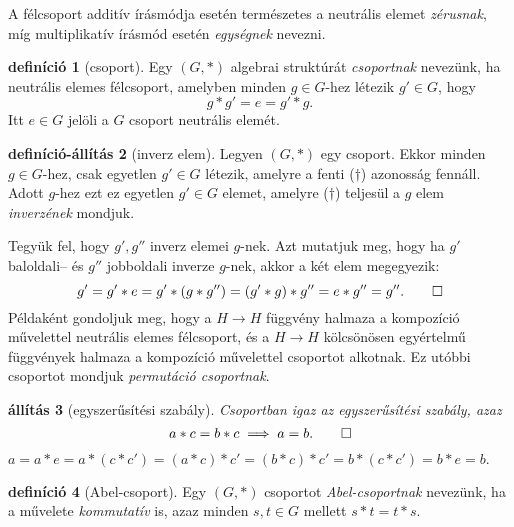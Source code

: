 \documentclass[9pt, a4paper, showtrims]{memoir}
\makeatletter
\renewenvironment{proof}[1][\proofname]
    {\par\pushQED{\qed}%
    \normalfont \topsep6\p@\@plus6\p@\relax
    \trivlist
    \item[\hskip\labelsep
        \itshape
    #1\@addpunct{:}]\ignorespaces}
    {\popQED\endtrivlist\@endpefalse}
\theoremstyle{plain}
\newtheorem{proposition}{állítás}[chapter]
\theoremstyle{remark}
\theoremstyle{definition}
\newtheorem{definition}[proposition]{definíció}
\newtheorem{defprop}[proposition]{definíció-állítás}
\makeatother
\begin{document}
A félcsoport additív írásmódja esetén természetes a neutrális elemet \emph{zérusnak},
míg multiplikatív írásmód esetén \emph{egységnek} nevezni.
\begin{definition}[csoport]
    Egy $\left( G,\ast \right)$ algebrai struktúrát \emph{csoportnak} nevezünk,
    ha neutrális elemes félcsoport, amelyben minden $g\in G$-hez létezik $g'\in G$, hogy
    \[
        g\ast g'=e=g'\ast g.\tag{\dag}
    \]
    Itt $e\in G$ jelöli a $G$ csoport neutrális elemét.
\end{definition}
\begin{defprop}[inverz elem]
    Legyen $\left( G,\ast \right)$ egy csoport.
    Ekkor minden $g\in G$-hez, csak egyetlen $g'\in G$ létezik, 
    amelyre a fenti ($\dag$) azonosság fennáll.
    Adott $g$-hez ezt ez egyetlen $g'\in G$ elemet, 
    amelyre ($\dag$) teljesül a $g$ elem \emph{inverzének} mondjuk.
\end{defprop}
\begin{proof}
    Tegyük fel, hogy $g',g''$ inverz elemei $g$-nek.
    Azt mutatjuk meg, hogy ha $g'$ baloldali-- és $g''$ jobboldali inverze $g$-nek,
    akkor a két elem megegyezik:
    \[
        g'=g'\ast e=
        g'\ast\left( g\ast g'' \right)=
        \left(g'\ast g\right)\ast g'' =
        e\ast g''=g''.\qedhere
    \]
\end{proof}
Példaként gondoljuk meg, hogy a $H\to H$ függvény halmaza a kompozíció művelettel
neutrális elemes félcsoport, és a $H\to H$ kölcsönösen egyértelmű függvények halmaza a kompozíció művelettel csoportot alkotnak. 
Ez utóbbi csoportot mondjuk \emph{permutáció csoportnak}.
\begin{proposition}[egyszerűsítési szabály]
    Csoportban igaz az egyszerűsítési szabály, azaz
    \[
        a\ast c=b\ast c\implies a=b.\qedhere
    \]
\end{proposition}
\begin{proof}
    \begin{math}
        a=a\ast e
        =
        a\ast \left( c\ast c'\right)=
        \left( a\ast c \right)\ast c'=
        \left( b\ast c \right)\ast c'=
        b\ast\left( c\ast c' \right)=
        b\ast e=
        b.
    \end{math}
\end{proof}
\begin{definition}[Abel-csoport]
    Egy $\left( G,\ast \right)$ csoportot \emph{Abel-csoportnak} nevezünk,
    ha a művelete \emph{kommutatív} is, 
    azaz minden $s,t\in G$ mellett $s\ast t=t\ast s$.
\end{definition}
\end{document}
